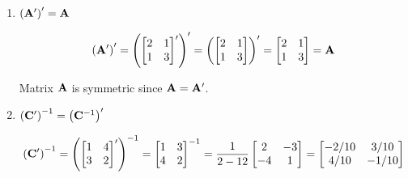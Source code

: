         \begin{enumerate}[label=(\alph*)]
            \item ${\left(\bold{A}^\prime\right)}^\prime = \bold{A}$
            

            \[
                {\left(\bold{A}^\prime\right)}^\prime = 
                {\left(
                    \begin{bmatrix}
                        2 & 1 \\
                        1 & 3
                    \end{bmatrix}^\prime
                    \right)}^\prime =
                {\left(
                    \begin{bmatrix}
                        2 & 1 \\
                        1 & 3
                    \end{bmatrix}
                    \right)}^\prime = 
                    \begin{bmatrix}
                        2 & 1 \\
                        1 & 3
                    \end{bmatrix} =
                    \bold{A}
            \]

            Matrix $\bold{A}$ is symmetric since $\bold{A} = \bold{A}^\prime$.


            \item ${\left(\bold{C}^\prime\right)}^{-1} = {\left(\bold{C}^{-1}\right)}^\prime$
            

            \[
                {\left(\bold{C}^\prime\right)}^{-1} = 
                {\left(
                    {\begin{bmatrix}
                        1 & 4 \\
                        3 & 2
                    \end{bmatrix}}^\prime\right)
                }^{-1} =
                {\begin{bmatrix}
                        1 & 3 \\
                        4 & 2
                \end{bmatrix}}^{-1} =
                \frac{1}{2-12}
                \begin{bmatrix}
                    2 & -3 \\
                    -4 & 1
                \end{bmatrix} =
                \begin{bmatrix}
                    -2/10 & 3/10 \\
                    4/10 & -1/10
                \end{bmatrix}
            \]


\end{enumerate}
